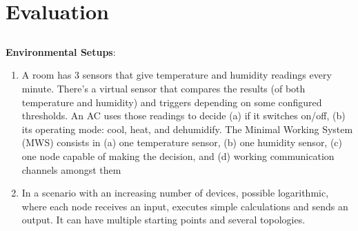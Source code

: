 \chapter{Evaluation} \label{chap:evaluation}

\section*{}

\textbf{Environmental Setups}:
\begin{enumerate}
    \item A room has 3 sensors that give temperature and humidity readings every minute. There’s a virtual sensor that compares the results (of both temperature and humidity) and triggers depending on some configured thresholds. An AC uses those readings to decide (a) if it switches on/off, (b) its operating mode: cool, heat, and dehumidify. The Minimal Working System (MWS) consists in (a) one temperature sensor, (b) one humidity sensor, (c) one node capable of making the decision, and (d) working communication channels amongst them
    \item In a scenario with an increasing number of devices, possible logarithmic, where each node receives an input, executes simple calculations and sends an output. It can have multiple starting points and several topologies.
\end{enumerate}

